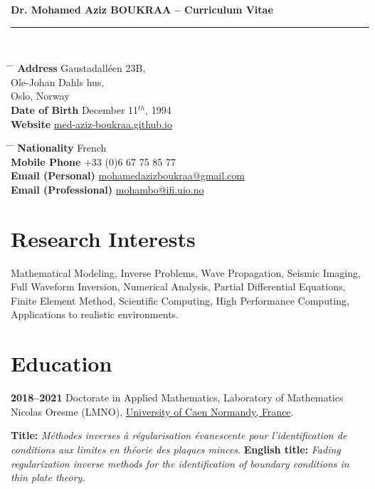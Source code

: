 \documentclass[10pt]{article}
\renewcommand{\title}[1]{%
{\huge\color{slateblue}\textbf{#1}}\\[2pt]
\rule{\textwidth}{0.5mm}\\
}
\begin{document}
\title{Dr. Mohamed Aziz BOUKRAA -- Curriculum Vitae}

\parbox{0.5\textwidth}{
\begin{tabbing}
\hspace{2.5cm} \= \hspace{4cm} \= \kill
{\bf Address} \> Gaustadalléen 23B,\\
\> Ole-Johan Dahls hus,\\
 Oslo, Norway \\
{\bf Date of Birth} \> December 11$^{th}$, 1994 \\
{\bf Website} \> \href{https://med-aziz-boukraa.github.io/}{med-aziz-boukraa.github.io}
\end{tabbing}}
\hspace{0.5cm}
\parbox{0.5\textwidth}{
\begin{tabbing}
\hspace{3.5cm} \= \hspace{4cm} \= \kill
{\bf Nationality} \> French \\
{\bf Mobile Phone} \> +33 (0)6 67 75 85 77 \\
{\bf Email (Personal)} \> \href{mailto:mohamedazizboukraa@gmail.com}{mohamedazizboukraa@gmail.com} \\
{\bf Email (Professional)} \> \href{mailto:mohambo@ifi.uio.no}{mohambo@ifi.uio.no}
\end{tabbing}}

\section{Research Interests}
Mathematical Modeling, Inverse Problems, Wave Propagation, Seismic Imaging, Full Waveform Inversion, Numerical Analysis, Partial Differential Equations, Finite Element Method, Scientific Computing, High Performance Computing, Applications to realistic environments.


\section{Education}

\textbf{2018--2021} \quad Doctorate in Applied Mathematics, Laboratory of Mathematics Nicolas Oresme (LMNO), \href{http://www.unicaen.fr/}{University of Caen Normandy, France}.  

\textbf{Title:} \textit{Méthodes inverses à régularisation évanescente pour l'identification de conditions aux limites en théorie des plaques minces}.  
\textbf{English title:} \textit{Fading regularization inverse methods for the identification of boundary conditions in thin plate theory.}  
\end{document}
